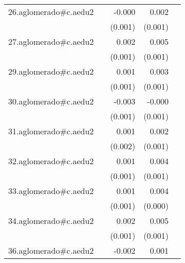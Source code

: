 {\begin{longtable}{l*{4}{D{.}{.}{-1}}}
\addlinespace
26.aglomerado#c.aedu2&                     &      -0.000         &       0.002\sym{**} &                     \\
            &                     &     (0.001)         &     (0.001)         &                     \\
\addlinespace
27.aglomerado#c.aedu2&                     &       0.002         &       0.005\sym{***}&                     \\
            &                     &     (0.001)         &     (0.001)         &                     \\
\addlinespace
29.aglomerado#c.aedu2&                     &       0.001         &       0.003\sym{***}&                     \\
            &                     &     (0.001)         &     (0.001)         &                     \\
\addlinespace
30.aglomerado#c.aedu2&                     &      -0.003\sym{*}  &      -0.000         &                     \\
            &                     &     (0.001)         &     (0.001)         &                     \\
\addlinespace
31.aglomerado#c.aedu2&                     &       0.001         &       0.002         &                     \\
            &                     &     (0.002)         &     (0.001)         &                     \\
\addlinespace
32.aglomerado#c.aedu2&                     &       0.001         &       0.004\sym{***}&                     \\
            &                     &     (0.001)         &     (0.001)         &                     \\
\addlinespace
33.aglomerado#c.aedu2&                     &       0.001         &       0.004\sym{***}&                     \\
            &                     &     (0.001)         &     (0.000)         &                     \\
\addlinespace
34.aglomerado#c.aedu2&                     &       0.002         &       0.005\sym{***}&                     \\
            &                     &     (0.001)         &     (0.001)         &                     \\
\addlinespace
36.aglomerado#c.aedu2&                     &      -0.002         &       0.001         &                     \\

\end{longtable}}
